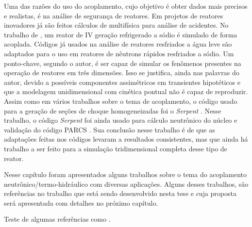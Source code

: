 
Uma das razões do uso do acoplamento, cujo objetivo é obter dados mais precisos e realistas, é na 
análise de segurança de reatores. Em projetos de reatores inovadores já são feitos cálculos de multifísica para 
análise de acidentes. No trabalho de \cite{Lazaro2013}, um reator de IV geração refrigerado a sódio 
é simulado de forma acoplada. Códigos já usados na análise de reatores resfriados a água leve são adaptados 
para o uso em reatores de nêutrons rápidos resfriados a sódio. Um ponto-chave, segundo o autor, é ser capaz 
de simular os fenômenos presentes na operação de reatores em três dimensões. Isso se justifica, ainda nas 
palavras do autor, devido a possíveis componentes assimétricos em transientes hipotéticos e que 
a modelagem unidimensional com cinética pontual não é capaz de reproduzir. Assim como em vários trabalhos 
sobre o tema de acoplamento, o código usado para a geração de seções de choque homogeneizadas 
foi o \textit{Serpent} \cite{Serpent2013}. Nesse trabalho, o código \textit{Serpent} foi ainda usado 
para cálculo neutrônico do núcleo e validação do código PARCS \cite{PARCS2006}. Sua conclusão nesse trabalho 
é de que as adaptações feitas nos códigos levaram a resultados consistentes, mas que ainda há trabalho 
a ser feito para a simulação tridimensional completa desse tipo de reator.

Nesse capítulo foram apresentados alguns trabalhos sobre o tema do acoplamento neutrônico/termo-hidráulico 
com diversas aplicações. Alguns desses trabalhos, são referências no trabalho que está sendo desenvolvido 
nesta tese e cuja proposta será apresentada com detalhes no próximo capítulo.

Teste de algumas referências como \cite{Fiorina2015}.

%

%    
%    
  

